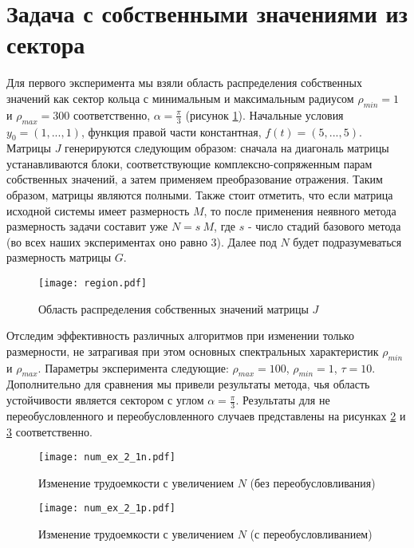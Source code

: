 \documentclass[a4paper, 14pt]{extreport} %
\begin{document}


\section{Задача с собственными значениями из сектора}
 Для первого эксперимента мы взяли область распределения собственных значений как сектор кольца с минимальным и максимальным радиусом $\rho_{min}=1$ и $\rho_{max} = 300$ соответственно, $\alpha = \frac{\pi}{3}$ (рисунок \ref{region_evals}).  Начальные условия $y_0=(1,...,1)$, функция правой части константная, $f(t) = (5,...,5)$. Матрицы $J$ генерируются следующим образом: сначала на диагональ матрицы устанавливаются блоки, соответствующие комплексно-сопряженным парам собственных значений, а затем применяем преобразование отражения. Таким образом, матрицы являются полными. Также стоит отметить, что если матрица исходной системы имеет размерность $M$, то после применения неявного метода размерность задачи составит уже $N = s\ M$, где $s$ - число стадий базового метода (во всех наших экспериментах оно равно 3). Далее под $N $ будет подразумеваться размерность матрицы $G$.

\begin{figure}[H]
\begin{center}
\texttt{[image: region.pdf]}
\caption{\small Область распределения собственных значений матрицы $J$}
\label{region_evals}
\end{center}
\end{figure}

Отследим эффективность различных алгоритмов при изменении только размерности, не затрагивая при этом основных спектральных характеристик  $\rho_{min}$ и $\rho_{max}$. Параметры эксперимента следующие: $\rho_{max} = 100$, $\rho_{min} = 1$, $\tau = 10$. Дополнительно для сравнения мы привели результаты метода, чья область устойчивости является сектором с углом $\alpha=\frac{\pi}{3}$. Результаты для  не переобусловленного и переобусловленного случаев представлены на рисунках  \ref{num_ex_2_1n} и  \ref{num_ex_2_1p} соответственно.
\begin{figure}[H]
\texttt{[image: num\_ex\_2\_1n.pdf]}
\caption{\small Изменение трудоемкости с увеличением  $N$ (без переобусловливания)}
\label{num_ex_2_1n}
\end{figure}
\begin{figure}[H]
\texttt{[image: num\_ex\_2\_1p.pdf]}
\caption{\small Изменение трудоемкости с увеличением  $N$ (с переобусловливанием)}
\label{num_ex_2_1p}
\end{figure}
\end{document}
